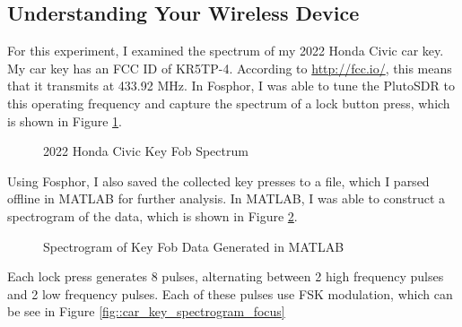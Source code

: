 \documentclass{article}
\begin{document}
\subsection{Understanding Your Wireless Device}

For this experiment, I examined the spectrum of my 2022 Honda Civic car key. My car key has an FCC ID of KR5TP-4. According to \url{http://fcc.io/}, this means that it transmits at 433.92 MHz. In Fosphor, I was able to tune the PlutoSDR to this operating frequency and capture the spectrum of a lock button press, which is shown in Figure \ref{fig::car_key_spectrum}.

\begin{figure}[H]
	\centerline{}
	\caption{2022 Honda Civic Key Fob Spectrum}
	\label{fig::car_key_spectrum}
\end{figure}

Using Fosphor, I also saved the collected key presses to a file, which I parsed offline in MATLAB for further analysis. In MATLAB, I was able to construct a spectrogram of the data, which is shown in Figure \ref{fig::car_key_spectrogram}.

\begin{figure}[H]
	\centerline{}
	\caption{Spectrogram of Key Fob Data Generated in MATLAB}
	\label{fig::car_key_spectrogram}
\end{figure}

Each lock press generates 8 pulses, alternating between 2 high frequency pulses and 2 low frequency pulses. Each of these pulses use FSK modulation, which can be see in Figure \ref{fig::car_key_spectrogram_focus}
\end{document}
